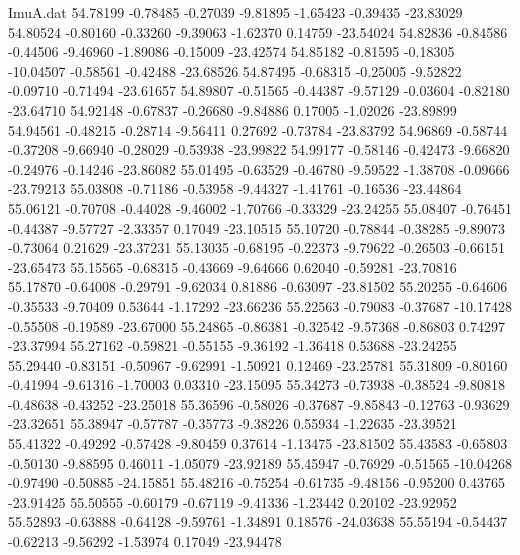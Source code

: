 \begin{filecontents}{ImuA.dat}
  54.78199   -0.78485   -0.27039   -9.81895   -1.65423   -0.39435  -23.83029
  54.80524   -0.80160   -0.33260   -9.39063   -1.62370    0.14759  -23.54024
  54.82836   -0.84586   -0.44506   -9.46960   -1.89086   -0.15009  -23.42574
  54.85182   -0.81595   -0.18305  -10.04507   -0.58561   -0.42488  -23.68526
  54.87495   -0.68315   -0.25005   -9.52822   -0.09710   -0.71494  -23.61657
  54.89807   -0.51565   -0.44387   -9.57129   -0.03604   -0.82180  -23.64710
  54.92148   -0.67837   -0.26680   -9.84886    0.17005   -1.02026  -23.89899
  54.94561   -0.48215   -0.28714   -9.56411    0.27692   -0.73784  -23.83792
  54.96869   -0.58744   -0.37208   -9.66940   -0.28029   -0.53938  -23.99822
  54.99177   -0.58146   -0.42473   -9.66820   -0.24976   -0.14246  -23.86082
  55.01495   -0.63529   -0.46780   -9.59522   -1.38708   -0.09666  -23.79213
  55.03808   -0.71186   -0.53958   -9.44327   -1.41761   -0.16536  -23.44864
  55.06121   -0.70708   -0.44028   -9.46002   -1.70766   -0.33329  -23.24255
  55.08407   -0.76451   -0.44387   -9.57727   -2.33357    0.17049  -23.10515
  55.10720   -0.78844   -0.38285   -9.89073   -0.73064    0.21629  -23.37231
  55.13035   -0.68195   -0.22373   -9.79622   -0.26503   -0.66151  -23.65473
  55.15565   -0.68315   -0.43669   -9.64666    0.62040   -0.59281  -23.70816
  55.17870   -0.64008   -0.29791   -9.62034    0.81886   -0.63097  -23.81502
  55.20255   -0.64606   -0.35533   -9.70409    0.53644   -1.17292  -23.66236
  55.22563   -0.79083   -0.37687  -10.17428   -0.55508   -0.19589  -23.67000
  55.24865   -0.86381   -0.32542   -9.57368   -0.86803    0.74297  -23.37994
  55.27162   -0.59821   -0.55155   -9.36192   -1.36418    0.53688  -23.24255
  55.29440   -0.83151   -0.50967   -9.62991   -1.50921    0.12469  -23.25781
  55.31809   -0.80160   -0.41994   -9.61316   -1.70003    0.03310  -23.15095
  55.34273   -0.73938   -0.38524   -9.80818   -0.48638   -0.43252  -23.25018
  55.36596   -0.58026   -0.37687   -9.85843   -0.12763   -0.93629  -23.32651
  55.38947   -0.57787   -0.35773   -9.38226    0.55934   -1.22635  -23.39521
  55.41322   -0.49292   -0.57428   -9.80459    0.37614   -1.13475  -23.81502
  55.43583   -0.65803   -0.50130   -9.88595    0.46011   -1.05079  -23.92189
  55.45947   -0.76929   -0.51565  -10.04268   -0.97490   -0.50885  -24.15851
  55.48216   -0.75254   -0.61735   -9.48156   -0.95200    0.43765  -23.91425
  55.50555   -0.60179   -0.67119   -9.41336   -1.23442    0.20102  -23.92952
  55.52893   -0.63888   -0.64128   -9.59761   -1.34891    0.18576  -24.03638
  55.55194   -0.54437   -0.62213   -9.56292   -1.53974    0.17049  -23.94478

\end{filecontents}
